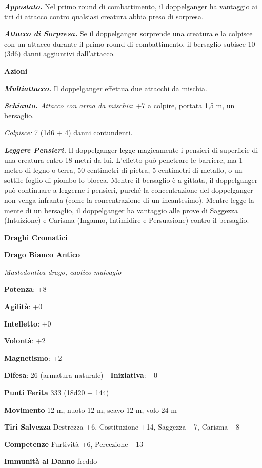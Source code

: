 \begin{multicols}{2}
\emph{\textbf{Appostato.}} Nel primo round di combattimento, il
doppelganger ha vantaggio ai tiri di attacco contro qualsiasi creatura
abbia preso di sorpresa.

\emph{\textbf{Attacco di Sorpresa.}} Se il doppelganger sorprende una
creatura e la colpisce con un attacco durante il primo round di
combattimento, il bersaglio subisce 10 (3d6) danni aggiuntivi
dall'attacco.

\textbf{Azioni}

\emph{\textbf{Multiattacco.}} Il doppelganger effettua due attacchi da
mischia.

\emph{\textbf{Schianto.} Attacco con arma da mischia}: +7 a colpire,
portata 1,5 m, un bersaglio.

\emph{Colpisce:} 7 (1d6 + 4) danni contundenti.

\emph{\textbf{Leggere Pensieri.}} Il doppelganger legge magicamente i
pensieri di superficie di una creatura entro 18 metri da lui. L'effetto
può penetrare le barriere, ma 1 metro di legno o terra, 50 centimetri di
pietra, 5 centimetri di metallo, o un sottile foglio di piombo lo
blocca. Mentre il bersaglio è a gittata, il doppelganger può continuare
a leggerne i pensieri, purché la concentrazione del doppelganger non
venga infranta (come la concentrazione di un incantesimo). Mentre legge
la mente di un bersaglio, il doppelganger ha vantaggio alle prove di
Saggezza (Intuizione) e Carisma (Inganno, Intimidire e Persuasione)
contro il bersaglio.

\textbf{Draghi Cromatici}

\textbf{Drago Bianco Antico}

\emph{Mastodontica drago, caotico malvagio}

\textbf{Potenza}: +8

\textbf{Agilità}: +0

\textbf{Intelletto}: +0

\textbf{Volontà}: +2

\textbf{Magnetismo}: +2

\textbf{Difesa}: 26 (armatura naturale) - \textbf{Iniziativa}: +0

\textbf{Punti Ferita} 333 (18d20 + 144)

\textbf{Movimento} 12 m, nuoto 12 m, scavo 12 m, volo 24 m

\textbf{Tiri Salvezza} Destrezza +6, Costituzione +14, Saggezza +7,
Carisma +8

\textbf{Competenze} Furtività +6, Percezione +13

\textbf{Immunità al Danno} freddo


\end{multicols}
